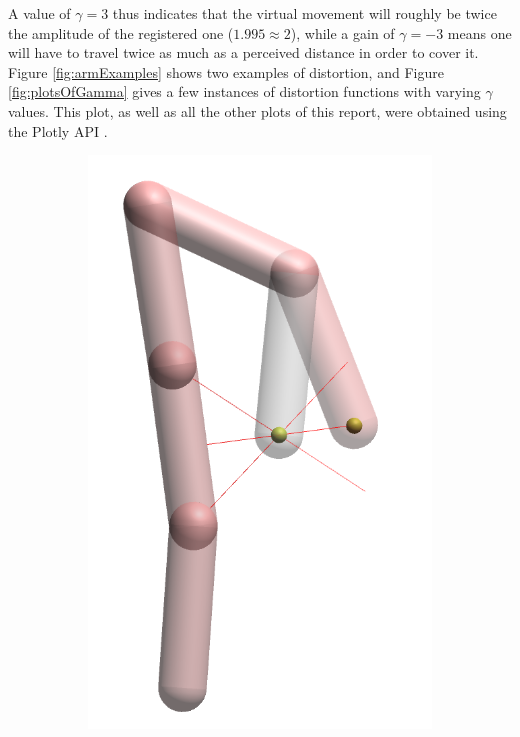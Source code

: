\noindent
A value of $\gamma = 3$ thus indicates that the virtual movement will roughly be twice the amplitude of the registered one ($1.995 \approx 2$), while a gain of $\gamma = -3$ means one will have to travel twice as much as a perceived distance in order to cover it. Figure \ref{fig:armExamples} shows two examples of distortion, and Figure \ref{fig:plotsOfGamma} gives a few instances of distortion functions with varying $\gamma $ values. This plot, as well as all the other plots of this report, were obtained using the Plotly API \cite{plotly}.

\begin{figure}
    \centering
    \begin{subfigure}[b]{0.2\textwidth}
        \includegraphics[width=\textwidth]{Figures/simple_distortion_3.png}

\end{subfigure}
\end{figure}
